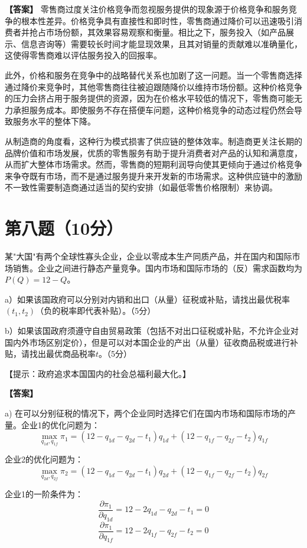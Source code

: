 \documentclass[12pt]{article}
\begin{document}
\noindent\textbf{【答案】}
零售商过度关注价格竞争而忽视服务提供的现象源于价格竞争和服务竞争的根本性差异。价格竞争具有直接性和即时性，零售商通过降价可以迅速吸引消费者并抢占市场份额，其效果容易观察和衡量。相比之下，服务投入（如产品展示、信息咨询等）需要较长时间才能显现效果，且其对销量的贡献难以准确量化，这使得零售商难以评估服务投入的回报率。

此外，价格和服务在竞争中的战略替代关系也加剧了这一问题。当一个零售商选择通过降价来竞争时，其他零售商往往被迫跟随降价以维持市场份额。这种价格竞争的压力会挤占用于服务提供的资源，因为在价格水平较低的情况下，零售商可能无力承担服务成本。即使服务不存在搭便车问题，这种价格竞争的动态过程仍然会导致服务水平的整体下降。

从制造商的角度看，这种行为模式损害了供应链的整体效率。制造商更关注长期的品牌价值和市场发展，优质的零售服务有助于提升消费者对产品的认知和满意度，从而扩大整体市场需求。然而，零售商的短期利润导向使其更倾向于通过价格竞争来争夺既有市场，而不是通过服务提升来开发新的市场需求。这种供应链中的激励不一致性需要制造商通过适当的契约安排（如最低零售价格限制）来协调。

\section*{第八题（10分）}
某"大国"有两个全球性寡头企业，企业以零成本生产同质产品，并在国内和国际市场销售。企业之间进行静态产量竞争。国内市场和国际市场的（反）需求函数均为$P(Q)=12-Q$。

a）如果该国政府可以分别对内销和出口（从量）征税或补贴，请找出最优税率$(t_1,t_2)$（负的税率即代表补贴）。（5分）

b）如果该国政府须遵守自由贸易政策（包括不对出口征税或补贴，不允许企业对国内外市场区别定价），但是可以对本国企业的产出（从量）征收商品税或进行补贴，请找出最优商品税率$t$。（5分）

【提示：政府追求本国国内的社会总福利最大化。】

\noindent\textbf{【答案】}

a) 在可以分别征税的情况下，两个企业同时选择它们在国内市场和国际市场的产量。企业1的优化问题为：
\[\max_{q_{1d},q_{1f}} \pi_1 = (12-q_{1d}-q_{2d}-t_1)q_{1d} + (12-q_{1f}-q_{2f}-t_2)q_{1f}\]

企业2的优化问题为：
\[\max_{q_{2d},q_{2f}} \pi_2 = (12-q_{1d}-q_{2d}-t_1)q_{2d} + (12-q_{1f}-q_{2f}-t_2)q_{2f}\]

企业1的一阶条件为：
\[\frac{\partial \pi_1}{\partial q_{1d}} = 12-2q_{1d}-q_{2d}-t_1 = 0\]
\[\frac{\partial \pi_1}{\partial q_{1f}} = 12-2q_{1f}-q_{2f}-t_2 = 0\]
\end{document}
